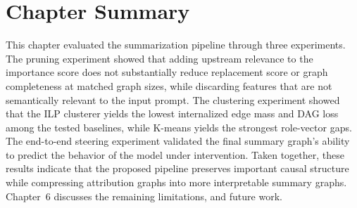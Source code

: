 \documentclass[../main.tex]{subfiles}
\begin{document}
\section{Chapter Summary}

This chapter evaluated the summarization pipeline through three experiments. The
pruning experiment showed that adding upstream relevance to the importance score
does not substantially reduce replacement score or graph completeness at matched
graph sizes, while discarding features that are not semantically relevant to the
input prompt. The clustering experiment showed that the ILP clusterer yields the
lowest internalized edge mass and DAG loss among the tested baselines, while
K-means yields the strongest role-vector gaps. The end-to-end steering
experiment validated the final summary graph's ability to predict the behavior
of the model under intervention. Taken
together, these results indicate that the proposed pipeline preserves important
causal structure while compressing attribution graphs into more interpretable
summary graphs. Chapter~6 discusses the remaining limitations, and future work.
\end{document}
